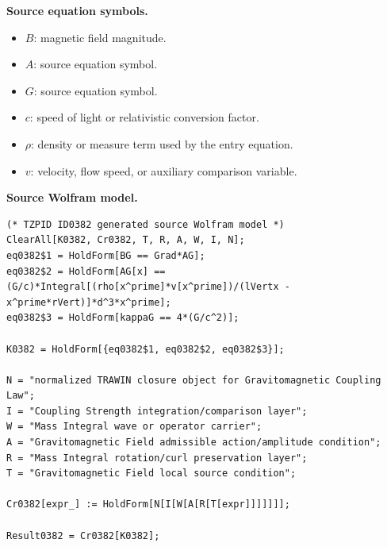 \begin{minipage}[t]{0.49\linewidth}
\begingroup
\small
\raggedright
\textbf{Source equation symbols.}\par
\begin{itemize}[leftmargin=1.35em,itemsep=1pt,topsep=1pt,parsep=0pt]
    \item $B$: magnetic field magnitude.
    \item $A$: source equation symbol.
    \item $G$: source equation symbol.
    \item $c$: speed of light or relativistic conversion factor.
    \item $\rho$: density or measure term used by the entry equation.
    \item $v$: velocity, flow speed, or auxiliary comparison variable.
\end{itemize}
\endgroup
\end{minipage}\hfill
\begin{minipage}[t]{0.47\linewidth}
\begingroup
\scriptsize
\raggedright
\textbf{Source Wolfram model.}\par
\begin{Verbatim}[fontsize=\tiny,breaklines=true,breakanywhere=true]
(* TZPID ID0382 generated source Wolfram model *)
ClearAll[K0382, Cr0382, T, R, A, W, I, N];
eq0382$1 = HoldForm[BG == Grad*AG];
eq0382$2 = HoldForm[AG[x] == (G/c)*Integral[(rho[x^prime]*v[x^prime])/(lVertx - x^prime*rVert)]*d^3*x^prime];
eq0382$3 = HoldForm[kappaG == 4*(G/c^2)];

K0382 = HoldForm[{eq0382$1, eq0382$2, eq0382$3}];

N = "normalized TRAWIN closure object for Gravitomagnetic Coupling Law";
I = "Coupling Strength integration/comparison layer";
W = "Mass Integral wave or operator carrier";
A = "Gravitomagnetic Field admissible action/amplitude condition";
R = "Mass Integral rotation/curl preservation layer";
T = "Gravitomagnetic Field local source condition";

Cr0382[expr_] := HoldForm[N[I[W[A[R[T[expr]]]]]]];

Result0382 = Cr0382[K0382];
\end{Verbatim}
\endgroup
\end{minipage}


